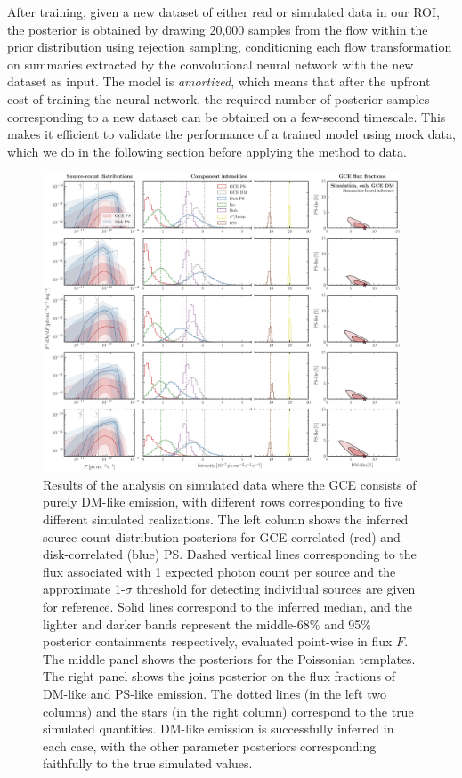 \documentclass[prd,aps,10pt,nofootinbib,twocolumn,superscriptaddress,preprintnumbers,balancelastpage,longbibliography]{revtex4-1}
\begin{document}
After training, given a new dataset of either real or simulated \Fermi data in our ROI, the posterior is obtained by drawing 20,000 samples from the flow within the prior distribution using rejection sampling, conditioning each flow transformation on summaries extracted by the convolutional neural network with the new dataset as input. The model is \emph{amortized}, which means that after the upfront cost of training the neural network, the required number of posterior samples corresponding to a new dataset can be obtained on a few-second timescale. This makes it efficient to validate the performance of a trained model using mock data, which we do in the following section before applying the method to \Fermi data.

%
\begin{figure}
\centering
\includegraphics[width=0.95\textwidth]{plots/sim_sbi_dm.pdf}
\caption{Results of the analysis on simulated \Fermi data where the GCE consists of purely DM-like emission, with different rows corresponding to five different simulated realizations. The left column shows the inferred source-count distribution posteriors for GCE-correlated (red) and disk-correlated (blue) PS. Dashed vertical lines corresponding to the flux associated with 1 expected photon count per source and the approximate 1-$\sigma$ threshold for detecting individual sources are given for reference. Solid lines correspond to the inferred median, and the lighter and darker bands represent the middle-68\% and 95\% posterior containments respectively, evaluated point-wise in flux $F$. The middle panel shows the posteriors for the Poissonian templates. The right panel shows the joins posterior on the flux fractions of DM-like and PS-like emission. The dotted lines (in the left two columns) and the stars (in the right column) correspond to the true simulated quantities. DM-like emission is successfully inferred in each case, with the other parameter posteriors corresponding faithfully to the true simulated values.} 
\label{fig:sim_sbi_dm}
\end{figure}
%
\end{document}
